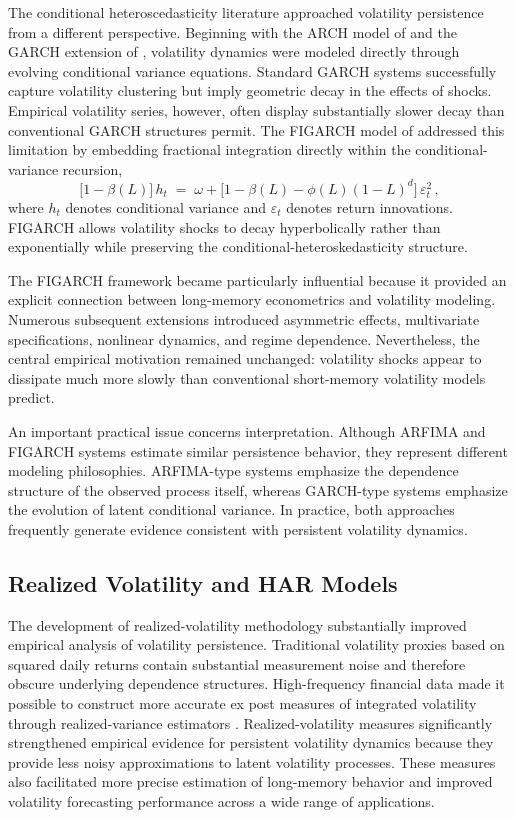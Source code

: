 \documentclass[unnumsec,webpdf,contemporary,large]{oup-authoring-template}%
\theoremstyle{thmstyleone}%
\theoremstyle{thmstyletwo}%
\theoremstyle{thmstylethree}%
\begin{document}
The conditional heteroscedasticity literature approached volatility
persistence from a different perspective. Beginning with the ARCH model of
\citet{engle1982autoregressive} and the GARCH extension of
\citet{bollerslev1986generalized}, volatility dynamics were modeled directly
through evolving conditional variance equations. Standard GARCH systems
successfully capture volatility clustering but imply geometric decay in
the effects of shocks. Empirical volatility series, however, often display
substantially slower decay than conventional GARCH structures permit. The
FIGARCH model of \citet{baillie1996fractionally} addressed this limitation
by embedding fractional integration directly within the conditional-variance
recursion,
\begin{equation}
  \bigl[1 - \beta(L)\bigr]\, h_t \;=\; \omega
  + \bigl[1 - \beta(L) - \phi(L)(1-L)^d\bigr]\, \varepsilon_t^2 \,,
\end{equation}
where $h_t$ denotes conditional variance and $\varepsilon_t$ denotes return
innovations. FIGARCH allows volatility shocks to decay hyperbolically rather
than exponentially while preserving the conditional-heteroskedasticity
structure.

The FIGARCH framework became particularly influential because it provided an
explicit connection between long-memory econometrics and volatility
modeling. Numerous subsequent extensions introduced asymmetric effects,
multivariate specifications, nonlinear dynamics, and regime dependence.
Nevertheless, the central empirical motivation remained unchanged:
volatility shocks appear to dissipate much more slowly than conventional
short-memory volatility models predict.

An important practical issue concerns interpretation. Although ARFIMA and
FIGARCH systems estimate similar persistence behavior, they represent
different modeling philosophies. ARFIMA-type systems emphasize the
dependence structure of the observed process itself, whereas GARCH-type
systems emphasize the evolution of latent conditional variance. In practice,
both approaches frequently generate evidence consistent with persistent
volatility dynamics.

\subsection{Realized Volatility and HAR Models}

The development of realized-volatility methodology substantially improved
empirical analysis of volatility persistence. Traditional volatility proxies
based on squared daily returns contain substantial measurement noise and
therefore obscure underlying dependence structures. High-frequency financial
data made it possible to construct more accurate ex post measures of
integrated volatility through realized-variance estimators
\citep{andersen2003modeling,barndorff2002econometric}.
Realized-volatility measures significantly strengthened empirical evidence
for persistent volatility dynamics because they provide less noisy
approximations to latent volatility processes. These measures also
facilitated more precise estimation of long-memory behavior and improved
volatility forecasting performance across a wide range of applications.
\end{document}

